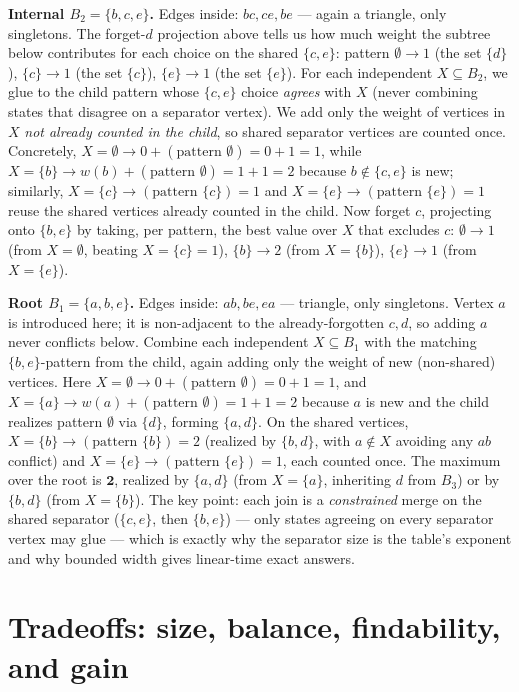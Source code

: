 \begin{labbox}
\textbf{Internal $B_2=\{b,c,e\}$.} Edges inside: $bc,ce,be$ --- again a triangle, only singletons. The forget-$d$ projection above tells us how much weight the subtree below contributes for each choice on the shared $\{c,e\}$: pattern $\emptyset\to1$ (the set $\{d\}$), $\{c\}\to1$ (the set $\{c\}$), $\{e\}\to1$ (the set $\{e\}$). For each independent $X\subseteq B_2$, we glue to the child pattern whose $\{c,e\}$ choice \emph{agrees} with $X$ (never combining states that disagree on a separator vertex). We add only the weight of vertices in $X$ \emph{not already counted in the child}, so shared separator vertices are counted once. Concretely, $X=\emptyset\to 0+(\text{pattern }\emptyset)=0+1=1$, while $X=\{b\}\to w(b)+(\text{pattern }\emptyset)=1+1=2$ because $b\notin\{c,e\}$ is new; similarly, $X=\{c\}\to(\text{pattern }\{c\})=1$ and $X=\{e\}\to(\text{pattern }\{e\})=1$ reuse the shared vertices already counted in the child. Now forget $c$, projecting onto $\{b,e\}$ by taking, per pattern, the best value over $X$ that excludes $c$: $\emptyset\to1$ (from $X=\emptyset$, beating $X=\{c\}{=}1$), $\{b\}\to2$ (from $X=\{b\}$), $\{e\}\to1$ (from $X=\{e\}$).

\textbf{Root $B_1=\{a,b,e\}$.} Edges inside: $ab,be,ea$ --- triangle, only singletons. Vertex $a$ is introduced here; it is non-adjacent to the already-forgotten $c,d$, so adding $a$ never conflicts below. Combine each independent $X\subseteq B_1$ with the matching $\{b,e\}$-pattern from the child, again adding only the weight of new (non-shared) vertices. Here $X=\emptyset\to 0+(\text{pattern }\emptyset)=0+1=1$, and $X=\{a\}\to w(a)+(\text{pattern }\emptyset)=1+1=2$ because $a$ is new and the child realizes pattern $\emptyset$ via $\{d\}$, forming $\{a,d\}$. On the shared vertices, $X=\{b\}\to(\text{pattern }\{b\})=2$ (realized by $\{b,d\}$, with $a\notin X$ avoiding any $ab$ conflict) and $X=\{e\}\to(\text{pattern }\{e\})=1$, each counted once. The maximum over the root is $\mathbf 2$, realized by $\{a,d\}$ (from $X=\{a\}$, inheriting $d$ from $B_3$) or by $\{b,d\}$ (from $X=\{b\}$). The key point: each join is a \emph{constrained} merge on the shared separator ($\{c,e\}$, then $\{b,e\}$) --- only states agreeing on every separator vertex may glue --- which is exactly why the separator size is the table's exponent and why bounded width gives linear-time exact answers.
\end{labbox}

\section{Tradeoffs: size, balance, findability, and gain}

